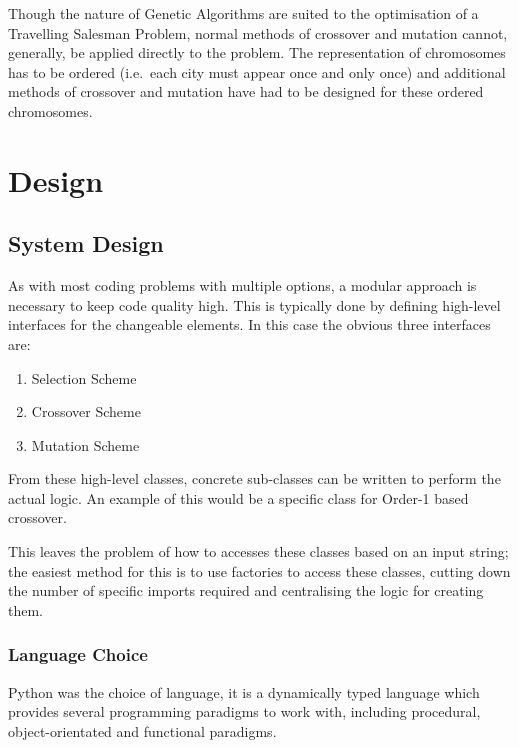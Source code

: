 \documentclass[10pt, a4paper]{article}
\begin{document}
Though the nature of Genetic Algorithms are suited to the optimisation of a
Travelling Salesman Problem, normal methods of crossover and mutation cannot,
generally, be applied directly to the problem. The representation of 
chromosomes has to be ordered (i.e.\ each city must appear once and only once)
and additional methods of crossover and mutation have had to be designed for
these ordered chromosomes.

\newpage
\section{Design}

\subsection{System Design}
As with most coding problems with multiple options, a modular approach is
necessary to keep code quality high. This is typically done by defining
high-level interfaces for the changeable elements. In this case the obvious
three interfaces are:

\begin{enumerate}
\item Selection Scheme
\item Crossover Scheme
\item Mutation Scheme
\end{enumerate}

From these high-level classes, concrete sub-classes can be written to perform
the actual logic. An example of this would be a specific class for Order-1
based crossover.

This leaves the problem of how to accesses these classes based on an input
string; the easiest method for this is to use factories to access these 
classes, cutting down the number of specific imports required and centralising
the logic for creating them.



\subsubsection{Language Choice}
Python was the choice of language, it is a dynamically typed language which 
provides several programming paradigms to work with, including procedural,
object-orientated and functional paradigms.
\end{document}
